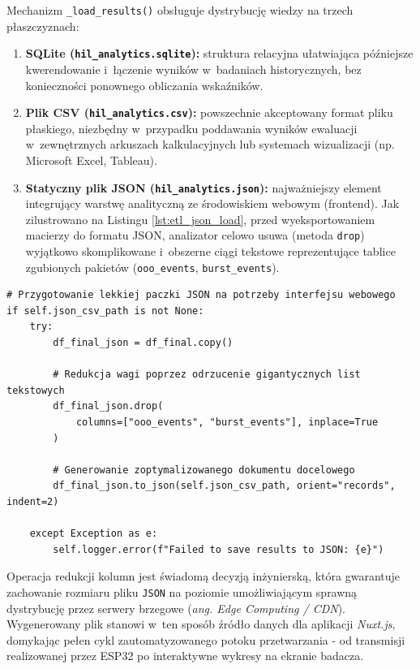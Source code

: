 Mechanizm \texttt{\_load\_results()} obsługuje dystrybucję wiedzy na trzech płaszczyznach:
\begin{enumerate}
    \item \textbf{SQLite (\texttt{hil\_analytics.sqlite}):}
          struktura relacyjna ułatwiająca późniejsze kwerendowanie i~łączenie wyników w~badaniach historycznych, bez konieczności ponownego obliczania wskaźników.
    \item \textbf{Plik CSV (\texttt{hil\_analytics.csv}):}
          powszechnie akceptowany format pliku płaskiego, niezbędny w~przypadku poddawania wyników ewaluacji w~zewnętrznych arkuszach kalkulacyjnych lub systemach wizualizacji (np. Microsoft Excel, Tableau).
    \item \textbf{Statyczny plik JSON (\texttt{hil\_analytics.json}):}
          najważniejszy element integrujący warstwę analityczną ze środowiskiem webowym (frontend).
          Jak zilustrowano na Listingu \ref{lst:etl_json_load}, przed wyeksportowaniem macierzy do formatu JSON, analizator celowo usuwa (metoda \texttt{drop}) wyjątkowo skomplikowane i~obszerne ciągi tekstowe reprezentujące tablice zgubionych pakietów (\texttt{ooo\_events}, \texttt{burst\_events}).
\end{enumerate}

\begin{listing}[htbp]
    \caption{Optymalizacja wagi pliku wynikowego dla aplikacji SPA Nuxt (\texttt{batch\_analyzer.py}) \cite{espy_nexus_python_host}.}
    \label{lst:etl_json_load}
    \begin{verbatim}
# Przygotowanie lekkiej paczki JSON na potrzeby interfejsu webowego
if self.json_csv_path is not None:
    try:
        df_final_json = df_final.copy()
        
        # Redukcja wagi poprzez odrzucenie gigantycznych list tekstowych
        df_final_json.drop(
            columns=["ooo_events", "burst_events"], inplace=True
        ) 
        
        # Generowanie zoptymalizowanego dokumentu docelowego
        df_final_json.to_json(self.json_csv_path, orient="records", indent=2)
        
    except Exception as e:
        self.logger.error(f"Failed to save results to JSON: {e}")
\end{verbatim}
\end{listing}

Operacja redukcji kolumn jest świadomą decyzją inżynierską, która gwarantuje zachowanie rozmiaru pliku \texttt{JSON} na poziomie umożliwiającym sprawną dystrybucję przez serwery brzegowe (\textit{ang. Edge Computing / CDN}).
Wygenerowany plik stanowi w~ten sposób źródło danych dla aplikacji \textit{Nuxt.js}, domykając pełen cykl zautomatyzowanego potoku przetwarzania - od transmisji realizowanej przez ESP32 po interaktywne wykresy na ekranie badacza.
